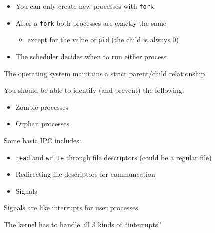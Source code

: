  \begin{slide}


    \begin{itemize}
      \item You can only create new processes with \texttt{fork}
      \item After a \texttt{fork} both processes are exactly the same
      \begin{itemize}
        \item except for the value of \texttt{pid} (the child is always 0)
      \end{itemize}
      \item The scheduler decides when to run either process
    \end{itemize}

  \end{slide}

  \begin{slide}


    The operating system maintains a strict parent/child relationship
    \bigskip
    
    You should be able to identify (and prevent) the following:
    \begin{itemize}
      \item Zombie processes
      \item Orphan processes
    \end{itemize}

  \end{slide}

  \begin{slide}

    Some basic IPC includes:
    \begin{itemize}
      \item \texttt{read} and \texttt{write} through file descriptors (could be a regular file)
      \item Redirecting file descriptors for communcation
      \item Signals
    \end{itemize}
    \bigskip

    Signals are like interrupts for user processes

    \leftspace{}The kernel has to handle all 3 kinds of ``interrupts''
  \end{slide}

